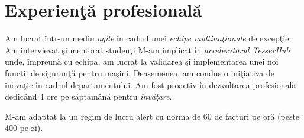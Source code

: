 %


\section{Experien\c{t}\u{a} profesional\u{a}}

{
\idea Am lucrat \^{i}ntr-un mediu \emph{agile} \^{i}n cadrul unei \emph{echipe multina\c{t}ionale} de excep\c{t}ie.
\idea Am intervievat \c{s}i mentorat studen\c{t}i
\idea M-am implicat \^{i}n \emph{acceleratorul TesserHub} unde, \^{i}mpreun\u{a} cu echipa, am lucrat la validarea \c{s}i implementarea unei noi functii de siguran\c{t}\u{a} pentru ma\c{s}ini. Deasemenea, am {condus o ini\c{t}iativa de inova\c{t}ie} \^{i}n cadrul departamentului. 
\idea Am fost proactiv \^{i}n dezvoltarea profesional\u{a} dedic\^{a}nd 4 ore pe s\u{a}pt\u{a}m\^{a}n\u{a} pentru \emph{\^{i}nv\u{a}\c{t}are}.
}

{
\idea M-am adaptat la un regim de lucru alert cu norma de 60 de facturi pe or\u{a} (peste 400 pe zi).
}